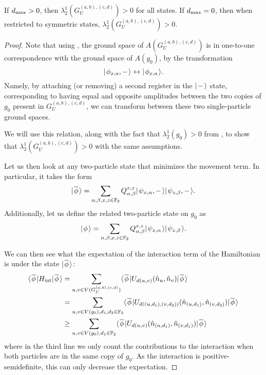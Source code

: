 \documentclass[../thesis-main/thesis-main]{subfiles}
\begin{document}
\begin{lemma}
  If $d_{\text{max}} >0$, then $\lambda_2^1(G_U^{(a,b),(c,d)}) > 0$ for all states.  If $d_{\text{max}} = 0$, then when restricted to symmetric states, $\lambda_2^1(G_U^{(a,b),(c,d)}) > 0$.
  \label{lem:2particle_element_bound}
\end{lemma}
\begin{proof}
  Note that using , the ground space of $A(G_U^{(a,b),(c,d)})$ is in one-to-one correspondence with the ground space of $A(g_0)$, by the transformation
  \begin{equation}
    |\mspace{2mu} \phi_{x,a},- \mspace{2mu} \rangle \leftrightarrow |\mspace{2mu} \phi_{x,a} \mspace{2mu} \rangle\label{eq:phi_copy_transform}.
  \end{equation}
  Namely, by attaching (or removing) a second register in the $|\mspace{2mu} - \mspace{2mu} \rangle$ state, corresponding to having equal and opposite amplitudes between the two copies of $g_0$ present in $G_U^{(a,b),(c,d)}$, we can transform between these two single-particle ground spaces.
  
  We will use this relation, along with the fact that $\lambda_2^1(g_0) > 0$ from , to show that $\lambda_2^1(G_U^{(a,b),(c,d)}) > 0$ with the same assumptions.

  Let us then look at any two-particle state that minimizes the movement term.  In particular, it takes the form
  \begin{equation}
    |\mspace{2mu} \overline{\phi} \mspace{2mu} \rangle = \sum_{\alpha,\beta,x,z\in \mathbb{F}_2} Q_{\alpha,\beta}^{x,z} |\mspace{2mu} \psi_{x,\alpha},- \mspace{2mu} \rangle|\mspace{2mu} \psi_{z,\beta},- \mspace{2mu} \rangle.
  \end{equation}
  Additionally, let us define the related two-particle state on $g_0$ as
  \begin{equation}
     |\mspace{2mu} \phi \mspace{2mu} \rangle = \sum_{\alpha,\beta,x,z\in \mathbb{F}_2} Q_{\alpha,\beta}^{x,z} |\mspace{2mu} \psi_{x,\alpha} \mspace{2mu} \rangle|\mspace{2mu} \psi_{z,\beta} \mspace{2mu} \rangle.
  \end{equation}
  
  We can then see what the expectation of the interaction term of the Hamiltonian is under the state $|\mspace{2mu} \overline{\phi} \mspace{2mu} \rangle$: 
  \begin{align}
    \langle\mspace{2mu} \overline{\phi} \mspace{2mu} | H_\text{int} |\mspace{2mu} \overline{\phi} \mspace{2mu} \rangle &= \sum_{u,v\in V(G_U^{(a,b),(c,d)})} \langle\mspace{2mu} \overline{\phi} \mspace{2mu} | U_{d(u,v)}(\hat{n}_u,\hat{n}_v) |\mspace{2mu} \overline{\phi} \mspace{2mu} \rangle\\
      &= \sum_{u,v\in V(g_0),d_1,d_2\in \mathbb{F}_2} \langle\mspace{2mu} \overline{\phi} \mspace{2mu} | U_{d((u,d_1),(v,d_2))}(\hat{n}_{(u,d_1)},\hat{n}_{(v,d_2)}) |\mspace{2mu} \overline{\phi} \mspace{2mu} \rangle\\
      &\geq \sum_{u,v\in V(g_0),d_1\in \mathbb{F}_2} \langle\mspace{2mu} \overline{\phi} \mspace{2mu} | U_{d(u,v)} (\hat{n}_{(u,d_1)},\hat{n}_{(v,d_1)}) |\mspace{2mu} \overline{\phi} \mspace{2mu} \rangle
  \end{align}
  where in the third line we only count the contributions to the interaction when both particles are in the same copy of $g_0$.  As the interaction is positive-semidefinite, this can only decrease the expectation.  
  

\end{proof}
\end{document}
